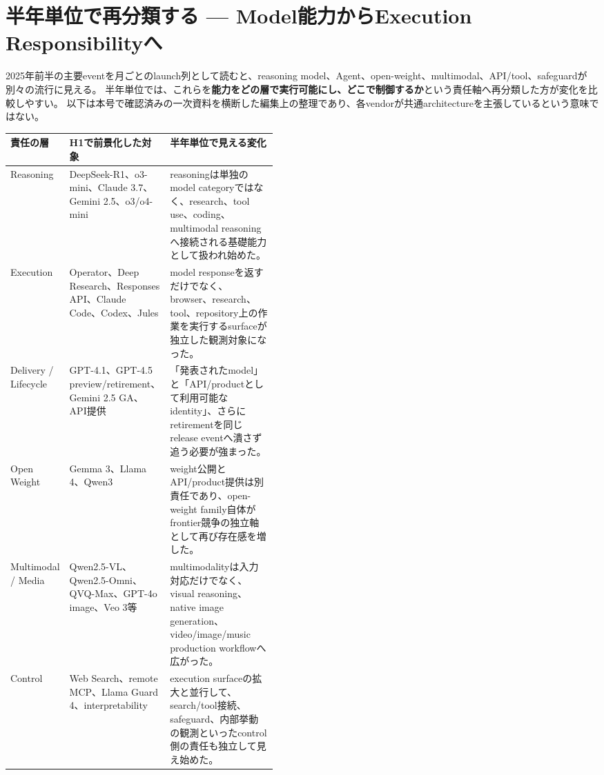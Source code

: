 \section{半年単位で再分類する — Model能力からExecution Responsibilityへ}
\label{analysis:h1-reclassification}

2025年前半の主要eventを月ごとのlaunch列として読むと、reasoning model、Agent、open-weight、multimodal、API/tool、safeguardが別々の流行に見える。
半年単位では、これらを\textbf{能力をどの層で実行可能にし、どこで制御するか}という責任軸へ再分類した方が変化を比較しやすい。
以下は本号で確認済みの一次資料を横断した編集上の整理であり、各vendorが共通architectureを主張しているという意味ではない。

\begin{center}
\small
\renewcommand{\arraystretch}{1.18}
\begin{tabularx}{\linewidth}{@{}p{0.19\linewidth}p{0.26\linewidth}X@{}}
\toprule
責任の層 & H1で前景化した対象 & 半年単位で見える変化 \\
\midrule
Reasoning & DeepSeek-R1、o3-mini、Claude 3.7、Gemini 2.5、o3/o4-mini &
reasoningは単独のmodel categoryではなく、research、tool use、coding、multimodal reasoningへ接続される基礎能力として扱われ始めた。
\cite{src-8f8555b73e1b,src-650b567698aa,src-a6c92f94a0af,src-421ee9af3f80,src-bf92f3d905c3} \\
Execution & Operator、Deep Research、Responses API、Claude Code、Codex、Jules &
model responseを返すだけでなく、browser、research、tool、repository上の作業を実行するsurfaceが独立した観測対象になった。
\cite{src-95b210494c88,src-8fec3ef3a97d,src-78593f4b387f,src-a6c92f94a0af,src-e7aef8f1b13b,src-8b595b787bad} \\
Delivery / Lifecycle & GPT-4.1、GPT-4.5 preview/retirement、Gemini 2.5 GA、API提供 &
「発表されたmodel」と「API/productとして利用可能なidentity」、さらにretirementを同じrelease eventへ潰さず追う必要が強まった。
\cite{src-31799a46d8d0,src-3fa7f4cd510b,src-53f15d483a2d} \\
Open Weight & Gemma 3、Llama 4、Qwen3 &
weight公開とAPI/product提供は別責任であり、open-weight family自体がfrontier競争の独立軸として再び存在感を増した。
\cite{src-1bb16d7254b1,src-05f285e9757b,src-3e4a3f3b3d83} \\
Multimodal / Media & Qwen2.5-VL、Qwen2.5-Omni、QVQ-Max、GPT-4o image、Veo 3等 &
multimodalityは入力対応だけでなく、visual reasoning、native image generation、video/image/music production workflowへ広がった。
\cite{src-dc21f366b638,src-de4ffd746276,src-8cb736b33646,src-877e7da88408,src-e68f8ce96685} \\
Control & Web Search、remote MCP、Llama Guard 4、interpretability &
execution surfaceの拡大と並行して、search/tool接続、safeguard、内部挙動の観測といったcontrol側の責任も独立して見え始めた。
\cite{src-e31c642d34b6,src-9257c39d4172,src-383476bdf62e,src-fdc10e3226e6} \\
\bottomrule
\end{tabularx}
\renewcommand{\arraystretch}{1.0}
\end{center}
\normalsize

